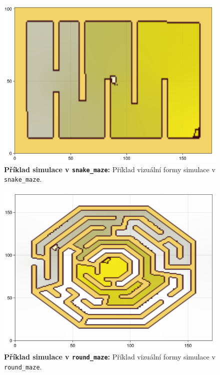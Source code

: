 \documentclass[10pt,a4paper,twocolumn]{article}
\begin{document}
\begin{figure}[tb]
  \centering
  \includegraphics[width=0.98\linewidth]{images/snake_visual.png}
  \caption{\textbf{Příklad simulace v \texttt{snake\_maze}:} 
  Příklad vizuální formy simulace v \texttt{snake\_maze}.}
  \label{fig:snake_vis}
\end{figure} 

\begin{figure}[tb]
  \centering
  \includegraphics[width=0.98\linewidth]{images/round_visual.png}
  \caption{\textbf{Příklad simulace v \texttt{round\_maze}:} 
  Příklad vizuální formy simulace v \texttt{round\_maze}.}
  \label{fig:round_vis}
\end{figure} 
\end{document}
